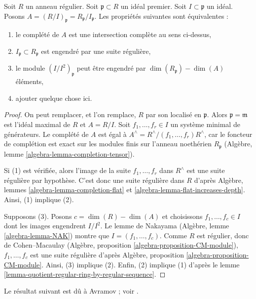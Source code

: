 \begin{lemma}
\label{lemma-quotient-regular-ring}
Soit $R$ un anneau régulier. Soit $\mathfrak p \subset R$ un idéal premier.
Soit $I \subset\mathfrak p$ un idéal.
Posons $A = (R/I)_\mathfrak p = R_\mathfrak p/I_\mathfrak p$.
Les propriétés suivantes sont équivalentes :
\begin{enumerate}
\item le complété de $A$
est une intersection complète au sens ci-dessus,
\item $I_\mathfrak p \subset R_\mathfrak p$ est engendré
par une suite régulière,
\item le module $(I/I^2)_\mathfrak p$ peut être engendré par
$\dim(R_\mathfrak p) - \dim(A)$ éléments,
\item ajouter quelque chose ici.
\end{enumerate}
\end{lemma}

\begin{proof} On
peut remplacer, et l'on remplace, $R$ par son localisé en $\mathfrak p$.
Alors $\mathfrak p = \mathfrak m$ est l'idéal maximal de $R$
et $A = R/I$. Soit $f_1, \ldots, f_r \in I$ un système minimal
de générateurs. Le complété de $A$ est égal à
$A^\wedge = R^\wedge/(f_1, \ldots, f_r)R^\wedge$,
car le foncteur de complétion est exact sur les modules finis sur l'anneau noethérien
$R_\mathfrak p$ (Algèbre,
lemme \ref{algebra-lemma-completion-tensor}).

\medskip\noindent
Si (1) est vérifiée, alors l'image de la suite $f_1, \ldots, f_r$ dans $R^\wedge$
est une suite régulière par hypothèse. C'est donc une suite régulière
dans $R$ d'après Algèbre, lemmes \ref{algebra-lemma-completion-flat} et
\ref{algebra-lemma-flat-increases-depth}. Ainsi, (1) implique (2).

\medskip\noindent
Supposons (3). Posons $c = \dim(R) - \dim(A)$ et choisissons $f_1, \ldots, f_c \in I$
dont les images engendrent $I/I^2$. Le lemme de Nakayama
(Algèbre, lemme \ref{algebra-lemma-NAK})
montre que $I = (f_1, \ldots, f_c)$. Comme $R$ est régulier, donc de
Cohen--Macaulay (Algèbre, proposition \ref{algebra-proposition-CM-module}),
$f_1, \ldots, f_c$ est une suite régulière
d'après Algèbre, proposition \ref{algebra-proposition-CM-module}.
Ainsi, (3) implique (2).
Enfin, (2) implique (1) d'après le
lemme \ref{lemma-quotient-regular-ring-by-regular-sequence}.
\end{proof}

\noindent
Le résultat suivant est dû à Avramov ; voir \cite{Avramov}.

